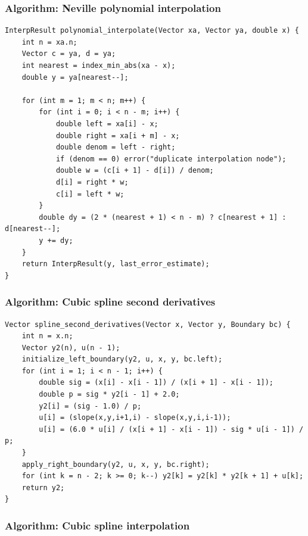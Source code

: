 \documentclass[11pt]{article}
\begin{document}
\subsubsection{Algorithm: Neville polynomial interpolation}\label{algorithm-neville-polynomial-interpolation}

\begin{verbatim}
InterpResult polynomial_interpolate(Vector xa, Vector ya, double x) {
    int n = xa.n;
    Vector c = ya, d = ya;
    int nearest = index_min_abs(xa - x);
    double y = ya[nearest--];

    for (int m = 1; m < n; m++) {
        for (int i = 0; i < n - m; i++) {
            double left = xa[i] - x;
            double right = xa[i + m] - x;
            double denom = left - right;
            if (denom == 0) error("duplicate interpolation node");
            double w = (c[i + 1] - d[i]) / denom;
            d[i] = right * w;
            c[i] = left * w;
        }
        double dy = (2 * (nearest + 1) < n - m) ? c[nearest + 1] : d[nearest--];
        y += dy;
    }
    return InterpResult(y, last_error_estimate);
}
\end{verbatim}

\subsubsection{Algorithm: Cubic spline second derivatives}\label{algorithm-cubic-spline-second-derivatives}

\begin{verbatim}
Vector spline_second_derivatives(Vector x, Vector y, Boundary bc) {
    int n = x.n;
    Vector y2(n), u(n - 1);
    initialize_left_boundary(y2, u, x, y, bc.left);
    for (int i = 1; i < n - 1; i++) {
        double sig = (x[i] - x[i - 1]) / (x[i + 1] - x[i - 1]);
        double p = sig * y2[i - 1] + 2.0;
        y2[i] = (sig - 1.0) / p;
        u[i] = (slope(x,y,i+1,i) - slope(x,y,i,i-1));
        u[i] = (6.0 * u[i] / (x[i + 1] - x[i - 1]) - sig * u[i - 1]) / p;
    }
    apply_right_boundary(y2, u, x, y, bc.right);
    for (int k = n - 2; k >= 0; k--) y2[k] = y2[k] * y2[k + 1] + u[k];
    return y2;
}
\end{verbatim}

\subsubsection{Algorithm: Cubic spline interpolation}\label{algorithm-cubic-spline-interpolation}
\end{document}
